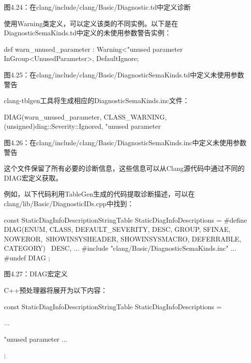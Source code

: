 \begin{center}
图4.24：在clang/include/clang/Basic/Diagnostic.td中定义诊断
\end{center}

使用Warning类定义，可以定义该类的不同实例。以下是在DiagnosticSemaKinds.td中定义的未使用参数警告实例：

\begin{shell}
def warn_unused_parameter : Warning<"unused parameter %
  InGroup<UnusedParameter>, DefaultIgnore;
\end{shell}

\begin{center}
图4.25：在clang/include/clang/Basic/DiagnosticSemaKinds.td中定义未使用参数警告
\end{center}

clang-tblgen工具将生成相应的DiagnosticSemaKinds.inc文件：

\begin{shell}
DIAG(warn_unused_parameter, CLASS_WARNING, (unsigned)diag::Severity::Ignored, "unused parameter %
\end{shell}

\begin{center}
图4.26：在clang/include/clang/Basic/DiagnosticSemaKinds.inc中定义未使用参数警告
\end{center}

这个文件保留了所有必要的诊断信息，这些信息可以从Clang源代码中通过不同的DIAG宏定义获取。

例如，以下代码利用TableGen生成的代码提取诊断描述，可以在clang/lib/Basic/DiagnosticIDs.cpp中找到：

\begin{cpp}
const StaticDiagInfoDescriptionStringTable StaticDiagInfoDescriptions = {
  #define DIAG(ENUM, CLASS, DEFAULT_SEVERITY, DESC, GROUP, SFINAE, NOWEROR,\
    SHOWINSYSHEADER, SHOWINSYSMACRO, DEFERRABLE, CATEGORY)    \
    DESC,
    ...
    #include "clang/Basic/DiagnosticSemaKinds.inc"
    ...
    #undef DIAG
};
\end{cpp}

\begin{center}
图4.27：DIAG宏定义
\end{center}

C++预处理器将展开为以下内容：

\begin{cpp}
const StaticDiagInfoDescriptionStringTable StaticDiagInfoDescriptions = {
    ...

    "unused parameter %
    ...
};
\end{cpp}

